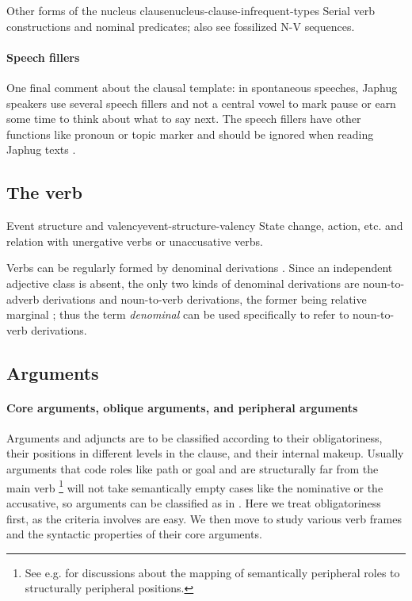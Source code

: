 \documentclass[a4paper, oneside, 12pt]{report}
\newcommand*{\citesec}[1]{\S~{#1}}
\newcommand*{\citechap}[1]{Ch~{#1}}
\newcommand*{\citepage}[1]{p.~{#1}}
\newcommand*{\term}[1]{\emph{#1}}
\begin{document}
\begin{todobox}{Other forms of the nucleus clause}{nucleus-clause-infrequent-types}
    Serial verb constructions and nominal predicates;
    also see fossilized N-V sequences. 
\end{todobox}

\paragraph*{Speech fillers}
One final comment about the clausal template:
in spontaneous speeches, Japhug speakers use several speech fillers and not a central vowel 
to mark pause or earn some time to think about what to say next.
The speech fillers have other functions like pronoun or topic marker
and should be ignored when reading Japhug texts
\citep[\citesec{10.3}]{jacques2021grammar}.

\subsection{The verb}

\begin{todobox}{Event structure and valency}{event-structure-valency}
    State change, action, etc. and relation with unergative verbs or unaccusative verbs.
\end{todobox}

Verbs can be regularly formed by denominal derivations
\citep[\citechap{20}]{jacques2021grammar}.
Since an independent adjective class is absent, 
the only two kinds of denominal derivations 
are noun-to-adverb derivations and noun-to-verb derivations,
the former being relative marginal \citep[\citepage{1011}]{jacques2021grammar};
thus the term \term{denominal} can be used specifically 
to refer to noun-to-verb derivations.

\subsection{Arguments}\label{sec:grammatical.clause.internal}

\paragraph*{Core arguments, oblique arguments, and peripheral arguments}
\label{sec:grammatical.clause.internal.core-oblique}
Arguments and adjuncts are to be classified according to 
their obligatoriness, their positions in different levels in the clause,
and their internal makeup.
Usually arguments that code roles like path or goal
and are structurally far from the main verb%
\footnote{
    See e.g. \citet[\citepage{30}]{cinque1999adverbs}
    for discussions about the mapping of semantically peripheral roles
    to structurally peripheral positions.
}
will not take semantically empty cases like the nominative or the accusative,
so arguments can be classified as in .
Here we treat obligatoriness first,
as the criteria involves are easy.
We then move to study various verb frames and the syntactic properties of their core arguments.
\end{document}
